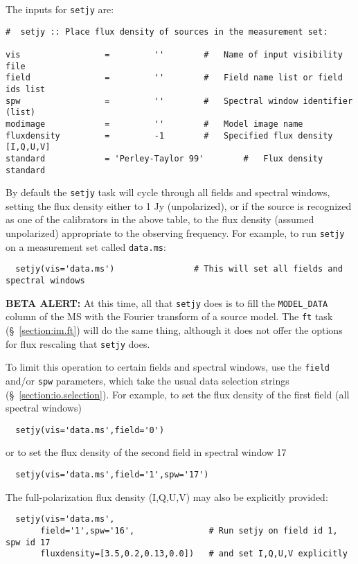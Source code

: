 The inputs for {\tt setjy} are:
\small
\begin{verbatim}
#  setjy :: Place flux density of sources in the measurement set:

vis                 =         ''        #   Name of input visibility file
field               =         ''        #   Field name list or field ids list
spw                 =         ''        #   Spectral window identifier (list)
modimage            =         ''        #   Model image name
fluxdensity         =         -1        #   Specified flux density [I,Q,U,V]
standard            = 'Perley-Taylor 99'        #   Flux density standard
\end{verbatim}
\normalsize
By default the {\tt setjy} task will cycle through all fields and
spectral windows, setting the flux density either to 1 Jy
(unpolarized), or if the source is recognized as one of the
calibrators in the above table, to the flux density (assumed
unpolarized) appropriate to the observing frequency.  For example,
to run {\tt setjy} on a measurement set called {\tt data.ms}:
\small
\begin{verbatim}
  setjy(vis='data.ms')                # This will set all fields and spectral windows
\end{verbatim}
\normalsize

{\bf BETA ALERT:} At this time, all that {\tt setjy} does is to fill
the {\tt MODEL\_DATA} column of the MS with the Fourier transform of
a source model.  The {\tt ft} task (\S~\ref{section:im.ft})
will do the same thing, although it does not offer the options for
flux rescaling that {\tt setjy} does.

To limit this operation to certain fields and spectral windows, use
the {\tt field} and/or {\tt spw} parameters, which take the usual
data selection strings (\S~\ref{section:io.selection}). For example, 
to set the flux density of the first field (all spectral windows)
\small
\begin{verbatim}
  setjy(vis='data.ms',field='0')
\end{verbatim}
\normalsize
or to set the flux density of the second field in spectral window 17
\small
\begin{verbatim}
  setjy(vis='data.ms',field='1',spw='17')
\end{verbatim}
\normalsize
The full-polarization flux density (I,Q,U,V) may also be explicitly provided:
\small
\begin{verbatim}
  setjy(vis='data.ms',
       field='1',spw='16',               # Run setjy on field id 1, spw id 17
       fluxdensity=[3.5,0.2,0.13,0.0])   # and set I,Q,U,V explicitly
\end{verbatim}
\normalsize

